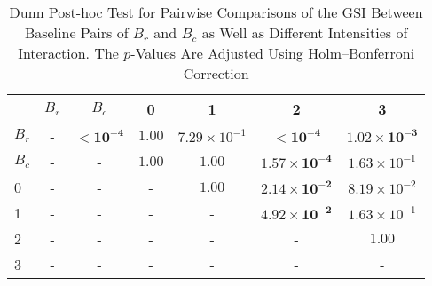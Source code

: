 \begin{table*}[!t]
\caption{Dunn Post-hoc Test for Pairwise Comparisons of the GSI Between Baseline Pairs of $B_r$ and $B_c$ as Well as Different Intensities of Interaction. The $p$-Values Are Adjusted Using Holm--Bonferroni Correction\label{tab:dunn_gsi}}
\centering
\begin{tabular}{lcccccc}
\toprule
 & $B_r$ & $B_c$ & 0 & 1 & 2 & 3 \\
\midrule
$B_r$ & - & $\mathbf{< 10^{-4}}$ & $1.00$ & $7.29 \times 10^{-1}$ & $\mathbf{< 10^{-4}}$ & $\mathbf{1.02 \times 10^{-3}}$ \\
$B_c$ & - & - & $1.00$ & $1.00$ & $\mathbf{1.57 \times 10^{-4}}$ & $1.63 \times 10^{-1}$ \\
0 & - & - & - & $1.00$ & $\mathbf{2.14 \times 10^{-2}}$ & $8.19 \times 10^{-2}$ \\
1 & - & - & - & - & $\mathbf{4.92 \times 10^{-2}}$ & $1.63 \times 10^{-1}$ \\
2 & - & - & - & - & - & $1.00$ \\
3 & - & - & - & - & - & - \\
\bottomrule
\end{tabular}
\end{table*}

